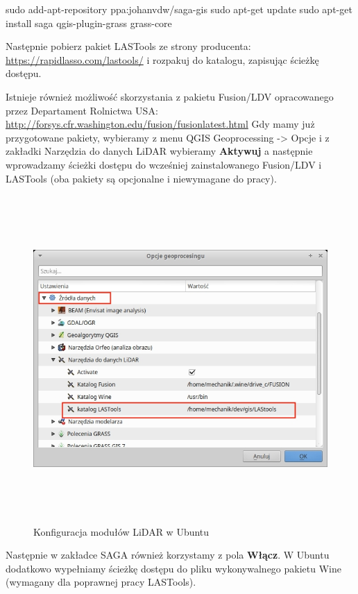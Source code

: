 \documentclass[12pt,a4paper]{book}
\begin{document}
sudo add-apt-repository ppa:johanvdw/saga-gis 
sudo apt-get update
sudo apt-get install saga qgis-plugin-grass grass-core

Następnie pobierz pakiet LASTools ze strony producenta: \url{https://rapidlasso.com/lastools/} i rozpakuj do katalogu, zapisując ścieżkę dostępu.

Istnieje również możliwość skorzystania z pakietu Fusion/LDV opracowanego przez Departament Rolnictwa USA: \url{http://forsys.cfr.washington.edu/fusion/fusionlatest.html} Gdy mamy już przygotowane pakiety, wybieramy z menu QGIS Geoprocessing -{\textgreater} Opcje i z zakładki Narzędzia do danych LiDAR wybieramy \textbf{Aktywuj }a następnie wprowadzamy ścieżki dostępu do wcześniej zainstalowanego Fusion/LDV i LASTools (oba pakiety są opcjonalne i niewymagane do pracy).



\begin{center}
\begin{figure}
\includegraphics[width=16.838cm,height=12.457cm]{002-lidar.jpg}
\caption{Konfiguracja modułów LiDAR w Ubuntu}
\end{figure} 
\end{center}
Następnie w zakładce SAGA również korzystamy z pola \textbf{Włącz}. W Ubuntu dodatkowo wypełniamy ścieżkę dostępu do pliku wykonywalnego pakietu Wine (wymagany dla poprawnej pracy LASTools).
\end{document}
